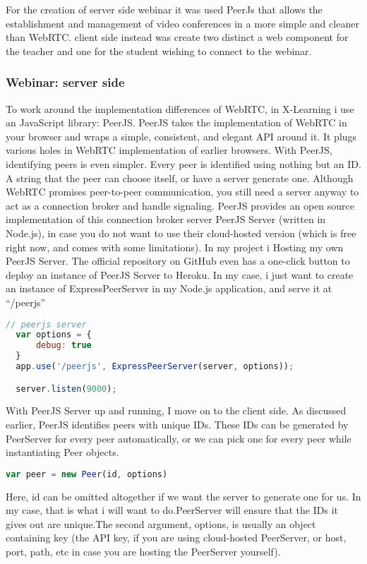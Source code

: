 For the creation of server side webinar it was used PeerJs that allows the establishment and management of video conferences in a more simple and
cleaner than WebRTC. client side instead was create two distinct a web component for the teacher and one for the student wishing to
connect to the webinar.

\subsubsection{Webinar: server side}
To work around the implementation differences of WebRTC, in X-Learning i use an JavaScript library: PeerJS.
PeerJS takes the implementation of WebRTC in your browser and wraps a simple, consistent, and elegant API around it. It plugs various holes in WebRTC implementation of earlier browsers. 
With PeerJS, identifying peers is even simpler. Every peer is identified using nothing but an ID. A string that the peer can choose itself, or have a server generate one. Although WebRTC promises peer-to-peer communication, you still need a server anyway to act as a connection broker and handle signaling. PeerJS provides an open source implementation of this connection broker server PeerJS Server (written in Node.js), in case you do not want to use their cloud-hosted version (which is free right now, and comes with some limitations).
In my project i Hosting my own PeerJS Server. The official repository on GitHub even has a one-click button to deploy an instance of PeerJS Server to Heroku.
In my case, i just want to create an instance of ExpressPeerServer in my Node.js application, and serve it at “/peerjs”

\begin{lstlisting}[language=javascript]
// peerjs server
  var options = {
      debug: true
  }
  app.use('/peerjs', ExpressPeerServer(server, options));

  server.listen(9000);
\end{lstlisting}


With PeerJS Server up and running, I move on to the client side. As discussed earlier, PeerJS identifies peers with unique IDs. These IDs can be generated by PeerServer for every peer automatically, or we can pick one for every peer while instantiating Peer objects.

\begin{lstlisting}[language=javascript]
var peer = new Peer(id, options)
\end{lstlisting}

Here, id can be omitted altogether if we want the server to generate one for us. In my case, that is what i will want to do.PeerServer will ensure that the IDs it gives out are unique.The second argument, options, is usually an object containing key (the API key, if you are using cloud-hosted PeerServer, or host, port, path, etc in case you are hosting the PeerServer yourself).

